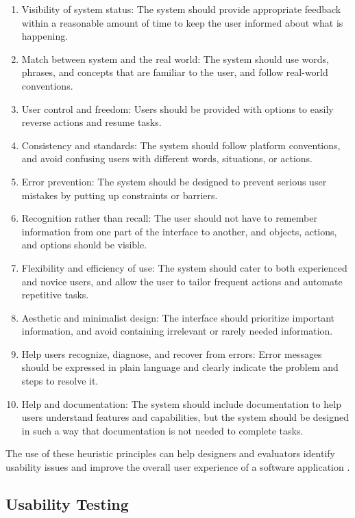 \documentclass[conference,onecolumn]{IEEEtran}
\begin{document}
        \begin{enumerate}
            \item Visibility of system status: The system should provide appropriate feedback within a reasonable amount of time to keep the user informed about what is happening.
            \item Match between system and the real world: The system should use words, phrases, and concepts that are familiar to the user, and follow real-world conventions.
            \item User control and freedom: Users should be provided with options to easily reverse actions and resume tasks.
            \item Consistency and standards: The system should follow platform conventions, and avoid confusing users with different words, situations, or actions.
            \item Error prevention: The system should be designed to prevent serious user mistakes by putting up constraints or barriers.
            \item Recognition rather than recall: The user should not have to remember information from one part of the interface to another, and objects, actions, and options should be visible.
            \item Flexibility and efficiency of use: The system should cater to both experienced and novice users, and allow the user to tailor frequent actions and automate repetitive tasks.
            \item Aesthetic and minimalist design: The interface should prioritize important information, and avoid containing irrelevant or rarely needed information.
            \item Help users recognize, diagnose, and recover from errors: Error messages should be expressed in plain language and clearly indicate the problem and steps to resolve it.    
            \item Help and documentation: The system should include documentation to help users understand features and capabilities, but the system should be designed in such a way that documentation is not needed to complete tasks.
        \end{enumerate}

        The use of these heuristic principles can help designers and evaluators identify usability issues and improve the overall user experience of a software application \cite{nielsen1994heuristic}.

    \subsection{Usability Testing}
        
\end{document}
